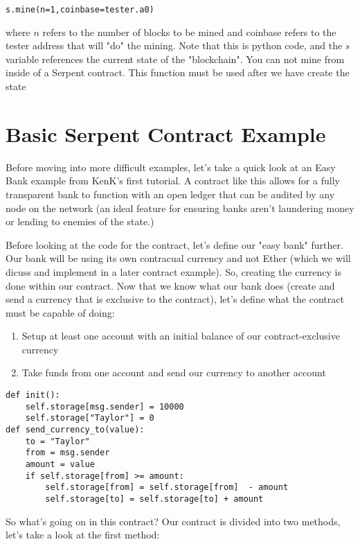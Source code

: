 \documentclass[12pt]{article}
\begin{document}
\begin{lstlisting}
s.mine(n=1,coinbase=tester.a0)
\end{lstlisting}

where $n$ refers to the number of blocks to be mined and coinbase refers to the tester address that will "do" the mining. Note that this is python code, and the $s$ variable references the current state of the "blockchain". You can not mine from inside of a Serpent contract. This function must be used after we have create the state \cite{Using pyethereum.tester}

\section{Basic Serpent Contract Example}
Before moving into more difficult examples, let's take a quick look at an Easy Bank example from KenK's first tutorial. A contract like this allows for a fully transparent bank to function with an open ledger that can be audited by any node on the network (an ideal feature for ensuring banks aren't laundering money or lending to enemies of the state.)

Before looking at the code for the contract, let's define our "easy bank" further. Our bank will be using its own contracual currency and not Ether (which we will dicuss and implement in a later contract example). So, creating the currency is done within our contract. Now that we know what our bank does (create and send a currency that is exclusive to the contract), let's define what the contract must be capable of doing:
\begin{enumerate}
\item Setup at least one account with an initial balance of our contract-exclusive currency
\item Take funds from one account and send our currency to another account
\end{enumerate}


\begin{lstlisting}[frame=single]
def init():
	self.storage[msg.sender] = 10000
	self.storage["Taylor"] = 0
def send_currency_to(value):
	to = "Taylor"
	from = msg.sender
	amount = value
	if self.storage[from] >= amount:
		self.storage[from] = self.storage[from]  - amount
		self.storage[to] = self.storage[to] + amount
\end{lstlisting}
		
		
So what's going on in this contract?
Our contract is divided into two methods, let's take a look at the first method:
\end{document}
